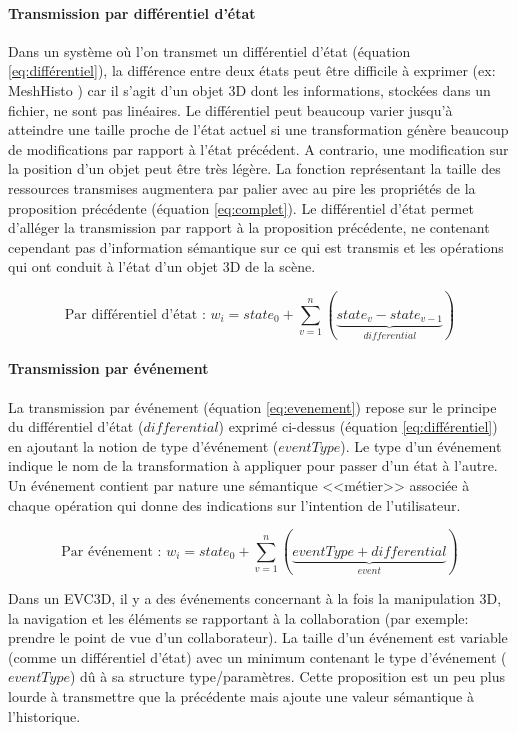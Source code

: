 \paragraph{Transmission par différentiel d'état}
\label{par:diff}
Dans un système où l'on transmet un différentiel d'état (équation 
\ref{eq:différentiel}), la différence entre deux états peut être difficile à exprimer (ex: 
MeshHisto \cite{Salvati2015})
car il s'agit d'un objet 3D dont les informations, stockées dans 
un fichier, ne sont pas linéaires. Le différentiel peut beaucoup varier jusqu'à 
atteindre une taille proche de l'état actuel si une transformation génère beaucoup 
de modifications par rapport à l'état précédent. A contrario, une modification sur la 
position d'un objet peut être très légère. La fonction représentant la taille des 
ressources transmises augmentera par palier avec au pire les propriétés de la 
proposition précédente (équation \ref{eq:complet}). Le différentiel d'état permet 
d'alléger la transmission par rapport à la proposition précédente, ne contenant 
cependant pas d'information sémantique sur ce qui est transmis et les opérations 
qui ont conduit à l'état d'un objet 3D de la scène.

\begin{equation}
\label{eq:différentiel}
\text{Par différentiel d'état : } w_i = state_0 + \sum_{v=1}^{n}(\underbrace{state_{v} 
- state_{v-1}}_{differential})
\end{equation}

\paragraph{Transmission par événement}
La transmission par événement (équation \ref{eq:evenement}) repose sur le 
principe du différentiel d'état ($differential$) exprimé ci-dessus (équation 
\ref{eq:différentiel}) en ajoutant la notion de type d'événement ($eventType$). Le 
type d'un événement indique le nom de la transformation à appliquer pour passer 
d'un état à l'autre. Un événement contient par nature une sémantique <<métier>> 
associée à chaque opération qui donne des indications sur l'intention de 
l'utilisateur. 

\begin{equation}
\label{eq:evenement}
\text{Par événement : } w_i= state_0 + \sum_{v=1}^{n}(\underbrace{eventType + 
differential}_{event}) 
\end{equation}

Dans un \gls{EVC3D}, il y a des événements concernant à la fois la manipulation 
3D, la navigation et les éléments se rapportant à la collaboration (par exemple: 
prendre le point de vue d'un collaborateur). La taille d'un événement est variable 
(comme un différentiel d'état) avec un minimum contenant le type d'événement 
($eventType$) dû à sa structure type/paramètres. Cette proposition est un peu 
plus lourde à transmettre que la précédente mais ajoute une valeur sémantique à 
l'historique.
